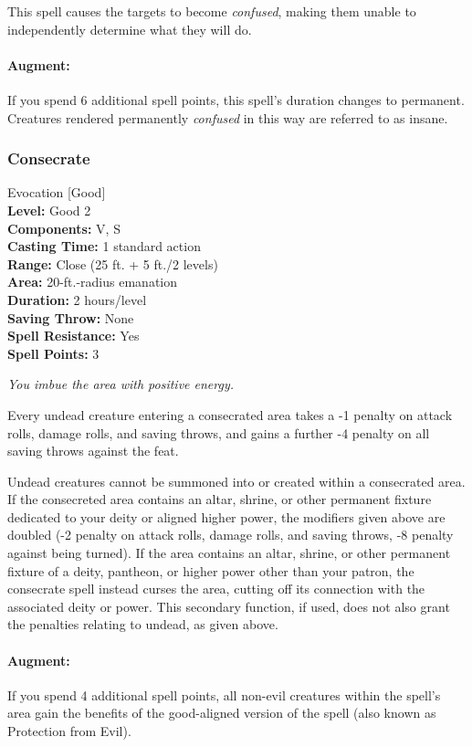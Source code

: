 This spell causes the targets to become \emph{confused}, making them unable to independently determine what they will do.

\paragraph{Augment:} If you spend 6 additional spell points, this spell's duration changes to permanent.
Creatures rendered permanently \emph{confused} in this way are referred to as insane.
\subsubsection{Consecrate}
\label{Spell:Consecrate}
Evocation [Good]
\\ \textbf{Level:} Good 2
\\ \textbf{Components:} V, S
\\ \textbf{Casting Time:} 1 standard action
\\ \textbf{Range:} Close (25 ft. + 5 ft./2 levels)
\\ \textbf{Area:} 20-ft.-radius emanation
\\ \textbf{Duration:} 2 hours/level
\\ \textbf{Saving Throw:} None
\\ \textbf{Spell Resistance:} Yes
\\ \textbf{Spell Points:} 3

\emph{You imbue the area with positive energy.}

Every undead creature entering a consecrated area takes a -1 penalty on attack rolls, damage rolls, and saving throws,
and gains a further -4 penalty on all saving throws against the  feat.

Undead creatures cannot be summoned into or created within a consecrated area.
If the consecreted area contains an altar, shrine, or other permanent fixture dedicated to your deity or aligned higher power, 
the modifiers given above are doubled (-2 penalty on attack rolls, damage rolls, and saving throws, -8 penalty against being turned). 
If the area contains an altar, shrine, or other permanent fixture of a deity, pantheon, or higher power other than your
patron, the consecrate spell instead curses the area, cutting off its connection with the associated deity or power. 
This secondary function, if used, does not also grant the penalties relating to undead, as given above.

\paragraph{Augment:} If you spend 4 additional spell points, all non-evil creatures within the spell's area gain the benefits of the good-aligned version of the
 spell (also known as Protection from Evil).
